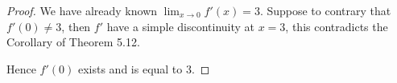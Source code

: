\begin{Exercise}
	\begin{proof}
		We have already known $\lim_{x\to 0}f'(x) = 3$.
		Suppose to contrary that $f'(0)\neq 3$, then $f'$ have a simple discontinuity at $x=3$, this contradicts the Corollary of Theorem 5.12.
		
		Hence $f'(0)$ exists and is equal to $3$.
	\end{proof}
\end{Exercise}